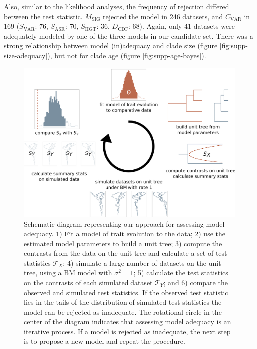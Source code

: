 \documentclass[a4paper,11pt]{article}
\begin{document}
Also, similar to the likelihood analyses, the frequency of rejection differed between the test statistic. $M_{\text{SIG}}$ rejected the model in 246 datasets, and $C_{\text{VAR}}$ in 169 ($S_{\text{VAR}}$: 76, $S_{\text{ASR}}$: 70, $S_{\text{HGT}}$: 36, $D_{\text{CDF}}$: 68). Again, only 41 datasets were adequately modeled by one of the three models in our candidate set. There was a strong relationship between model (in)adequacy and clade size (figure \ref{fig:supp-size-adequacy}), but not for clade age (figure \ref{fig:supp-age-bayes}).
 

\begin{figure}[p]
  \centering
  \includegraphics[scale=0.28]{figs/flowchart}
  \caption{Schematic diagram representing our approach for assessing model adequacy. 1) Fit a model of trait evolution to the data; 2) use the estimated model parameters to build a unit tree; 3) compute the contrasts from the data on the unit tree and calculate a set of test statistics $\mathcal{T}_X$; 4) simulate a large number of datasets on the unit tree, using a BM model with $\sigma^2= 1$; 5) calculate the test statistics on the contrasts of each simulated dataset $\mathcal{T}_Y$; and 6) compare the observed and simulated test statistics. If the observed test statistic lies in the tails of the distribution of simulated test statistics the model can be rejected as inadequate. The rotational circle in the center of the diagram indicates that assessing model adequacy is an iterative process. If a model is rejected as inadequate, the next step is to propose a new model and repeat the procedure.}
  \label{fig:flowchart}
\end{figure}
\end{document}
